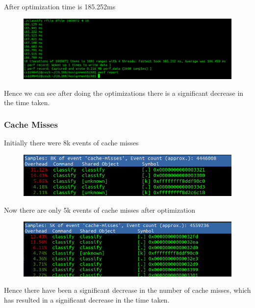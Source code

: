 \documentclass{article}
\begin{document}
After optimization time is 185.252ms 

\begin{figure}[H]
\centering
\includegraphics[width=1\textwidth]{images/186.png}
\end{figure}


Hence we can see after doing the optimizations there is a significant decrease in the time taken.

\subsubsection{Cache Misses}

Initially there were 8k events of cache misses 

\begin{figure}[H]
    \centering
    \includegraphics[width=1\textwidth]{images/8k.png}
    \end{figure}



Now there are only 5k events of cache misses after optimization

\begin{figure}[H]
    \centering
    \includegraphics[width=1\textwidth]{images/5k.png}
    \end{figure}

Hence there have been a significant decrease in the number of cache misses, which has resulted in a significant decrease in the time taken.
\end{document}
